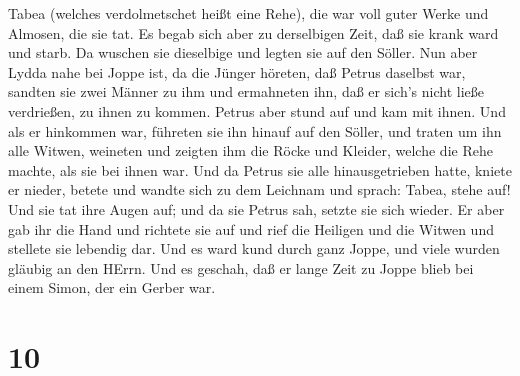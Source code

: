 Tabea (welches verdolmetschet heißt eine Rehe), die war voll guter Werke
und Almosen, die sie tat.  Es begab sich aber zu
derselbigen Zeit, daß sie krank ward und starb. Da wuschen sie
dieselbige und legten sie auf den Söller.  Nun aber Lydda
nahe bei Joppe ist, da die Jünger höreten, daß Petrus daselbst war,
sandten sie zwei Männer zu ihm und ermahneten ihn, daß er sich's nicht
ließe verdrießen, zu ihnen zu kommen.  Petrus aber stund
auf und kam mit ihnen. Und als er hinkommen war, führeten sie ihn hinauf
auf den Söller, und traten um ihn alle Witwen, weineten und zeigten ihm
die Röcke und Kleider, welche die Rehe machte, als sie bei ihnen war.
 Und da Petrus sie alle hinausgetrieben hatte, kniete er
nieder, betete und wandte sich zu dem Leichnam und sprach: Tabea, stehe
auf! Und sie tat ihre Augen auf; und da sie Petrus sah, setzte sie sich
wieder.  Er aber gab ihr die Hand und richtete sie auf und
rief die Heiligen und die Witwen und stellete sie lebendig dar.
 Und es ward kund durch ganz Joppe, und viele wurden
gläubig an den HErrn.  Und es geschah, daß er lange Zeit zu
Joppe blieb bei einem Simon, der ein Gerber war.

\hypertarget{section-9}{%
\section{10}\label{section-9}}

